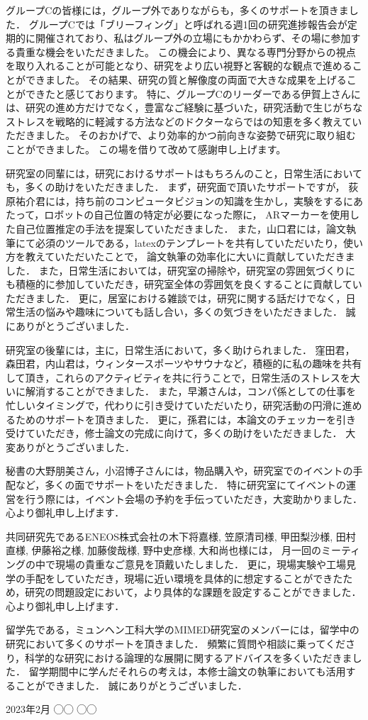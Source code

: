 \documentclass[../main]{subfiles}
\begin{document}
グループCの皆様には，グループ外でありながらも，多くのサポートを頂きました．
グループCでは「ブリーフィング」と呼ばれる週1回の研究進捗報告会が定期的に開催されており、私はグループ外の立場にもかかわらず、その場に参加する貴重な機会をいただきました。
この機会により、異なる専門分野からの視点を取り入れることが可能となり、研究をより広い視野と客観的な観点で進めることができました。
その結果、研究の質と解像度の両面で大きな成果を上げることができたと感じております。
特に、グループCのリーダーである伊賀上さんには、研究の進め方だけでなく，豊富なご経験に基づいた，研究活動で生じがちなストレスを戦略的に軽減する方法などのドクターならではの知恵を多く教えていただきました。
そのおかげで、より効率的かつ前向きな姿勢で研究に取り組むことができました。
この場を借りて改めて感謝申し上げます。

研究室の同輩には，研究におけるサポートはもちろんのこと，日常生活においても，多くの助けをいただきました．
まず，研究面で頂いたサポートですが，
荻原祐介君には，持ち前のコンピュータビジョンの知識を生かし，実験をするにあたって，ロボットの自己位置の特定が必要になった際に，
ARマーカーを使用した自己位置推定の手法を提案していただきました．
また，山口君には，論文執筆にて必須のツールである，latexのテンプレートを共有していただいたり，使い方を教えていただいたことで，
論文執筆の効率化に大いに貢献していただきました．
また，日常生活においては，研究室の掃除や，研究室の雰囲気づくりにも積極的に参加していただき，研究室全体の雰囲気を良くすることに貢献していただきました．
更に，居室における雑談では，研究に関する話だけでなく，日常生活の悩みや趣味についても話し合い，多くの気づきをいただきました．
誠にありがとうございました．

研究室の後輩には，主に，日常生活において，多く助けられました．
窪田君，森田君，内山君は，ウィンタースポーツやサウナなど，積極的に私の趣味を共有して頂き，これらのアクティビティを共に行うことで，日常生活のストレスを大いに解消することができました．
また，早瀬さんは，コンパ係としての仕事を忙しいタイミングで，代わりに引き受けていただいたり，研究活動の円滑に進めるためのサポートを頂きました．
更に，孫君には，本論文のチェッカーを引き受けていただき，修士論文の完成に向けて，多くの助けをいただきました．
大変ありがとうございました．


秘書の大野朋美さん，小沼博子さんには，物品購入や，研究室でのイベントの手配など，多くの面でサポートをいただきました．
特に研究室にてイベントの運営を行う際には，イベント会場の予約を手伝っていただき，大変助かりました．
心より御礼申し上げます．

共同研究先であるENEOS株式会社の木下将嘉様, 笠原清司様, 甲田梨沙様, 田村直様, 伊藤裕之様, 加藤俊哉様, 野中史彦様, 大和尚也様には，
月一回のミーティングの中で現場の貴重なご意見を頂戴いたしました．
更に，現場実験や工場見学の手配をしていただき，現場に近い環境を具体的に想定することができたため，研究の問題設定において，より具体的な課題を設定することができました．
心より御礼申し上げます．

留学先である，ミュンヘン工科大学のMIMED研究室のメンバーには，留学中の研究において多くのサポートを頂きました．
頻繁に質問や相談に乗ってくださり，科学的な研究における論理的な展開に関するアドバイスを多くいただきました．
留学期間中に学んだそれらの考えは，本修士論文の執筆においても活用することができました．
誠にありがとうございました．

\begin{flushright}
  2023年2月 ◯◯ ◯◯
\end{flushright}
\end{document}
